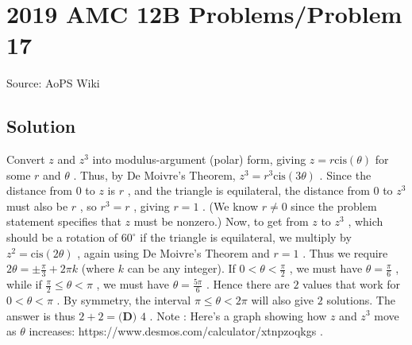 \documentclass[12pt]{article}
\begin{document}
\section*{{2019 AMC 12B Problems/Problem 17}}
Source: AoPS Wiki

\subsection*{Solution}
Convert $z$ and $z^3$ into modulus-argument (polar) form, giving $z=r\text{cis}(\theta)$ for some $r$ and $\theta$ . Thus, by De Moivre's Theorem, $z^3=r^3\text{cis}(3\theta)$ . Since the distance from $0$ to $z$ is $r$ , and the triangle is equilateral, the distance from $0$ to $z^3$ must also be $r$ , so $r^3=r$ , giving $r=1$ . (We know $r \neq 0$ since the problem statement specifies that $z$ must be nonzero.) Now, to get from $z$ to $z^3$ , which should be a rotation of $60^{\circ}$ if the triangle is equilateral, we multiply by $z^2 = \text{cis}(2\theta)$ , again using De Moivre's Theorem and $r=1$ . Thus we require $2\theta=\pm\frac{\pi}{3} + 2\pi k$ (where $k$ can be any integer). If $0 < \theta < \frac{\pi}{2}$ , we must have $\theta=\frac{\pi}{6}$ , while if $\frac{\pi}{2} \leq \theta < \pi$ , we must have $\theta = \frac{5\pi}{6}$ . Hence there are $2$ values that work for $0 < \theta < \pi$ . By symmetry, the interval $\pi \leq \theta < 2\pi$ will also give $2$ solutions. The answer is thus $2 + 2 = \boxed{\textbf{(D) }4}$ . Note : Here's a graph showing how $z$ and $z^3$ move as $\theta$ increases: https://www.desmos.com/calculator/xtnpzoqkgs .
\end{document}
